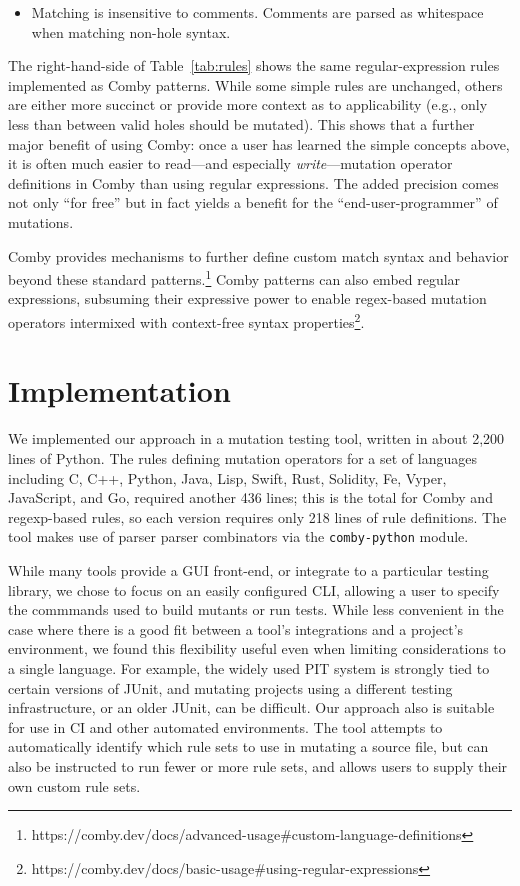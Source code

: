 \documentclass[sigconf,review, anonymous]{acmart}
\begin{document}
{\begin{itemize}
\item Matching is insensitive to comments. Comments are parsed as whitespace when matching non-hole syntax.

\end{itemize}

The right-hand-side of Table~\ref{tab:rules} shows the same regular-expression rules 
implemented as Comby patterns.  While some simple rules are
unchanged, others are either more succinct or provide more context as
to applicability (e.g., only less than between valid holes should be
mutated).  This shows that a
further major benefit of using Comby: once a user has learned
the simple concepts above, it is often much easier to read---and
especially \emph{write}---mutation
operator definitions in Comby than using regular expressions.  The
added precision comes not only ``for free'' but in fact yields a
benefit for the ``end-user-programmer'' of mutations.

Comby provides mechanisms to further define custom match syntax and behavior
beyond these standard patterns.\footnote{https://comby.dev/docs/advanced-usage\#custom-language-definitions} Comby patterns can also embed regular expressions, subsuming their
expressive power to enable regex-based mutation operators intermixed with
context-free syntax
properties\footnote{https://comby.dev/docs/basic-usage\#using-regular-expressions}.

\section{Implementation}
\label{sec:imp}

We implemented our approach in a mutation testing tool, written in
about 2,200 lines of Python.  The rules defining mutation operators
for a set of languages including C, C++, Python, Java, Lisp, Swift,
Rust, Solidity, Fe, Vyper, JavaScript, and Go, required another 436
lines; this is the total for Comby and regexp-based rules, so each
version requires only 218 lines of rule definitions.  The tool makes
use of parser parser combinators via the {\tt comby-python} module.

While many tools provide a GUI front-end, or integrate to a particular
testing library, we chose to focus on an easily configured CLI,
allowing a user to specify the commmands used to build mutants or
run tests.  While less convenient in the case where there is a good
fit between a tool's integrations and a project's environment, we
found this flexibility useful even when limiting considerations to a
single language.  For example, the widely used PIT system is strongly tied to
certain versions of JUnit, and mutating projects using a different
testing infrastructure, or an older JUnit, can be difficult.  Our
approach also is suitable for use in CI and other automated
environments.  The tool attempts to automatically identify which rule sets to use in
mutating a source file, but can also be instructed to run fewer or
more rule sets, and allows users to supply their own custom rule sets.

}
\end{document}
